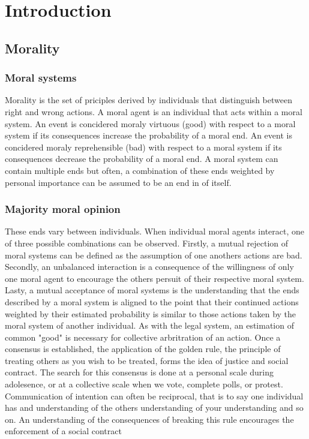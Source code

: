 \chapter{Introduction}
\section{Morality}
\subsection{Moral systems}
Morality is the set of priciples derived by individuals that distinguish between right and wrong actions.
A moral agent is an individual that acts within a moral system.
An event is concidered moraly virtuous (good) with respect to a moral system if its consequences increase the probability of a moral end.
An event is concidered moraly reprehensible (bad) with respect to a moral system if its consequences decrease the probability of a moral end.
A moral system can contain multiple ends but often, a combination of these ends weighted by personal importance can be assumed to be an end in of itself.

\subsection{Majority moral opinion}
These ends vary between individuals.
When individual moral agents interact, one of three possible combinations can be observed.
Firstly, a mutual rejection of moral systems can be defined as the assumption of one anothers actions are bad. 
Secondly, an unbalanced interaction is a consequence of the willingness of only one moral agent to encourage the others persuit of their respective moral system.
Lasty, a mutual acceptance of moral systems is the understanding that the ends described by a moral system is aligned to the point that their continued actions weighted by their estimated probability is similar to those actions taken by the moral system of another individual.
As with the legal system, an estimation of common "good" is necessary for collective arbritration of an action.
Once a consensus is established, the application of the golden rule, the principle of treating others as you wish to be treated, forms the idea of justice and social contract.
The search for this consensus is done at a personal scale during adolesence, or at a collective scale when we vote, complete polls, or protest.
Communication of intention can often be reciprocal, that is to say one individual has and understanding of the others understanding of your understanding and so on.
An understanding of the consequences of breaking this rule encourages the enforcement of a social contract


